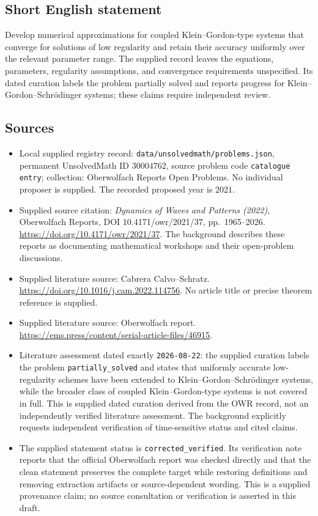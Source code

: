 \documentclass[11pt]{article}
\begin{document}
\subsection{Short English statement}
Develop numerical approximations for coupled Klein--Gordon-type systems that converge for solutions of low regularity and retain their accuracy uniformly over the relevant parameter range. The supplied record leaves the equations, parameters, regularity assumptions, and convergence requirements unspecified. Its dated curation labels the problem partially solved and reports progress for Klein--Gordon--Schr\"odinger systems; these claims require independent review.
\subsection{Sources}
\begin{itemize}
\item Local supplied registry record: \texttt{data/unsolvedmath/problems.json}, permanent UnsolvedMath ID \(30004762\), source problem code \texttt{catalogue entry}; collection: Oberwolfach Reports Open Problems. No individual proposer is supplied. The recorded proposed year is \(2021\).
\item Supplied source citation: \emph{Dynamics of Waves and Patterns (2022)}, Oberwolfach Reports, DOI 10.4171/owr/2021/37, pp.\ 1965--2026. \url{https://doi.org/10.4171/owr/2021/37}. The background describes these reports as documenting mathematical workshops and their open-problem discussions.
\item Supplied literature source: Cabrera Calvo--Schratz. \url{https://doi.org/10.1016/j.cam.2022.114756}. No article title or precise theorem reference is supplied.
\item Supplied literature source: Oberwolfach report. \url{https://ems.press/content/serial-article-files/46915}.
\item Literature assessment dated exactly \texttt{2026-08-22}: the supplied curation labels the problem \texttt{partially\_solved} and states that uniformly accurate low-regularity schemes have been extended to Klein--Gordon--Schr\"odinger systems, while the broader class of coupled Klein--Gordon-type systems is not covered in full. This is supplied dated curation derived from the OWR record, not an independently verified literature assessment. The background explicitly requests independent verification of time-sensitive status and cited claims.
\item The supplied statement status is \texttt{corrected\_verified}. Its verification note reports that the official Oberwolfach report was checked directly and that the clean statement preserves the complete target while restoring definitions and removing extraction artifacts or source-dependent wording. This is a supplied provenance claim; no source consultation or verification is asserted in this draft.
\end{itemize}
\end{document}
